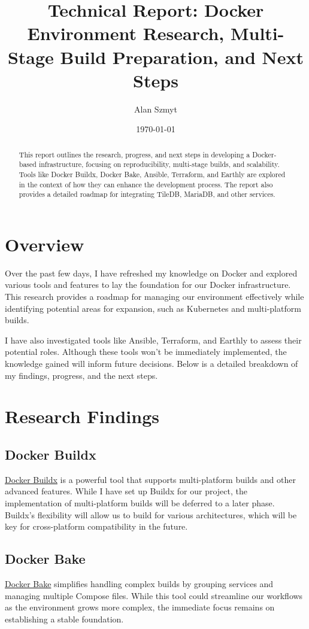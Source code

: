 \documentclass{article}
\title{Technical Report: Docker Environment Research, Multi-Stage Build Preparation, and Next Steps}
\author{Alan Szmyt}
\date{\today}
\begin{document}
\maketitle

\begin{abstract}
This report outlines the research, progress, and next steps in developing a Docker-based infrastructure, focusing on reproducibility, multi-stage builds, and scalability. Tools like Docker Buildx, Docker Bake, Ansible, Terraform, and Earthly are explored in the context of how they can enhance the development process. The report also provides a detailed roadmap for integrating TileDB, MariaDB, and other services.
\end{abstract}

\tableofcontents

\section{Overview}
Over the past few days, I have refreshed my knowledge on Docker and explored various tools and features to lay the foundation for our Docker infrastructure. This research provides a roadmap for managing our environment effectively while identifying potential areas for expansion, such as Kubernetes and multi-platform builds.

I have also investigated tools like Ansible, Terraform, and Earthly to assess their potential roles. Although these tools won’t be immediately implemented, the knowledge gained will inform future decisions. Below is a detailed breakdown of my findings, progress, and the next steps.

\section{Research Findings}

\subsection{Docker Buildx}
\href{https://docs.docker.com/buildx/working-with-buildx/}{Docker Buildx} is a powerful tool that supports multi-platform builds and other advanced features. While I have set up Buildx for our project, the implementation of multi-platform builds will be deferred to a later phase. Buildx's flexibility will allow us to build for various architectures, which will be key for cross-platform compatibility in the future.

\subsection{Docker Bake}
\href{https://docs.docker.com/engine/context/using_bake/}{Docker Bake} simplifies handling complex builds by grouping services and managing multiple Compose files. While this tool could streamline our workflows as the environment grows more complex, the immediate focus remains on establishing a stable foundation.
\end{document}
